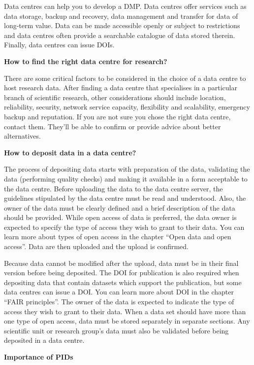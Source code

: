 \documentclass[
]{book}
\begin{document}
Data centres can help you to develop a DMP. Data centres offer services such as data storage, backup and recovery, data management and transfer for data of long-term value. Data can be made accessible openly or subject to restrictions and data centres often provide a searchable catalogue of data stored therein. Finally, data centres can issue DOIs.

\textbf{How to find the right data centre for research?}

There are some critical factors to be considered in the choice of a data centre to host research data. After finding a data centre that specialises in a particular branch of scientific research, other considerations should include location, reliability, security, network service capacity, flexibility and scalability, emergency backup and reputation. If you are not sure you chose the right data centre, contact them. They'll be able to confirm or provide advice about better alternatives.

\textbf{How to deposit data in a data centre?}

The process of depositing data starts with preparation of the data, validating the data (performing quality checks) and making it available in a form acceptable to the data centre. Before uploading the data to the data centre server, the guidelines stipulated by the data centre must be read and understood. Also, the owner of the data must be clearly defined and a brief description of the data should be provided. While open access of data is preferred, the data owner is expected to specify the type of access they wish to grant to their data. You can learn more about types of open access in the chapter ``Open data and open access''. Data are then uploaded and the upload is confirmed.

Because data cannot be modified after the upload, data must be in their final version before being deposited. The DOI for publication is also required when depositing data that contain datasets which support the publication, but some data centres can issue a DOI. You can learn more about DOI in the chapter ``FAIR principles''. The owner of the data is expected to indicate the type of access they wish to grant to their data. When a data set should have more than one type of open access, data must be stored separately in separate sections. Any scientific unit or research group's data must also be validated before being deposited in a data centre.

\textbf{Importance of PIDs}
\end{document}

